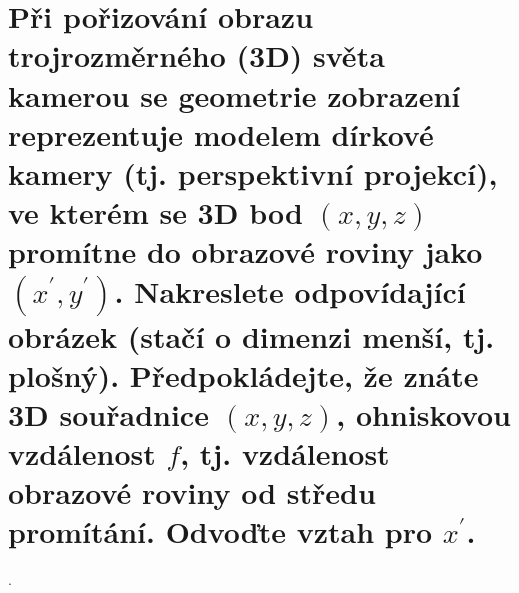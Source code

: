 \section{Při pořizování obrazu trojrozměrného (3D) světa kamerou se geometrie zobrazení reprezentuje modelem dírkové 
kamery (tj. perspektivní projekcí), ve kterém se 3D bod \texorpdfstring{$(x,y,z)$}{(x,y,z)} promítne do obrazové roviny 
jako \texorpdfstring{$(x^{\prime},y^{\prime})$}{(x',y')}. Nakreslete odpovídající obrázek (stačí o dimenzi menší, tj. 
plošný). Předpokládejte, že znáte 3D souřadnice \texorpdfstring{$(x,y,z)$}{(x,y,z)}, ohniskovou vzdálenost 
\texorpdfstring{$f$}{f}, tj. vzdálenost obrazové roviny od středu promítání. Odvoďte vztah pro 
\texorpdfstring{$x^{\prime}$}{x'}.}.